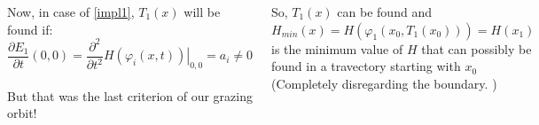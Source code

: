 \documentclass[xcolor=x11names,compress]{beamer}
\renewcommand{\(}{\begin{columns}}
\renewcommand{\)}{\end{columns}}
\newcommand{\<}[1]{\begin{column}{#1}}
\renewcommand{\>}{\end{column}}
\begin{document}
\begin{frame}
\begin{columns}[c]
Now, in case of \eqref{impl1}, $T_1(x)$ will be found if:
\[
\frac{\partial E_1}{\partial t}(0,0)=\frac{\partial^2}{\partial t^2}\left.  
H(\varphi_i(x,t))\right|_{0,0}=a_i\neq 0
\]
\\

But that was the last criterion of our grazing orbit!\\
\vspace{1em}

So, $T_1(x)$ can be found and $H_{min}(x)=H(\varphi_1(x_0,T_1(x_0)))=H(x_1)$ 
is the minimum value of $H$ that can possibly be found in a travectory 
starting with $x_0$ (Completely disregarding the boundary.  )\\

\begin{center}
\includegraphics[width=\textwidth]{ZDM}
\end{center}

\end{columns}
\end{frame}
\end{document}

